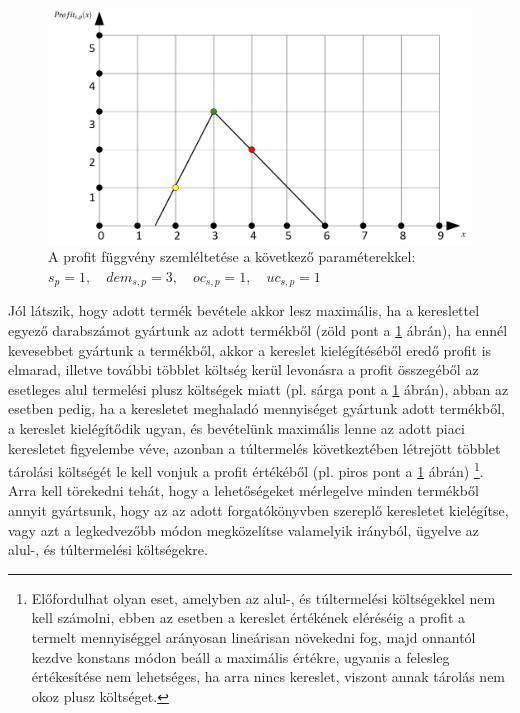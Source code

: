 \begin{figure}
\begin{center}
\includegraphics[scale=0.38]{profit_func}
\caption[A profit függvény szemléltetése a következő paraméterekkel:; $s_p=1,\quad dem_{s,p}=3, \quad oc_{s,p}=1, \quad  uc_{s,p}=1$]
    {A profit függvény szemléltetése a következő paraméterekkel: \\ $s_p=1,\quad dem_{s,p}=3, \quad oc_{s,p}=1, \quad  uc_{s,p}=1$\endtabular}
\label{profit_func}
\end{center}
\end{figure}
Jól látszik, hogy adott termék bevétele akkor lesz maximális, ha a kereslettel egyező darabszámot gyártunk az adott termékből (zöld pont a \ref{profit_func} ábrán), ha ennél kevesebbet gyártunk a termékből, akkor a kereslet kielégítéséből eredő profit is elmarad, illetve további többlet költség kerül levonásra a profit összegéből az esetleges alul termelési plusz költségek miatt (pl. sárga pont a \ref{profit_func} ábrán), abban az esetben pedig, ha a keresletet meghaladó mennyiséget gyártunk adott termékből, a kereslet kielégítődik ugyan, és bevételünk maximális lenne az adott piaci keresletet figyelembe véve, azonban a túltermelés következtében létrejött többlet tárolási költségét le kell vonjuk a profit értékéből (pl. piros pont a \ref{profit_func} ábrán) \footnote{Előfordulhat olyan eset, amelyben az alul-, és túltermelési költségekkel nem kell számolni, ebben az esetben a kereslet értékének eléréséig a profit a termelt mennyiséggel arányosan lineárisan növekedni fog, majd onnantól kezdve konstans módon beáll a maximális értékre, ugyanis a felesleg értékesítése nem lehetséges, ha arra nincs kereslet, viszont annak tárolás nem okoz plusz költséget.}.
Arra kell törekedni tehát, hogy a lehetőségeket mérlegelve minden termékből annyit gyártsunk, hogy az az adott forgatókönyvben szereplő keresletet kielégítse, vagy azt a legkedvezőbb módon megközelítse valamelyik irányból, ügyelve az alul-, és túltermelési költségekre.
